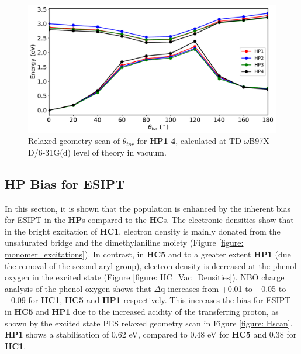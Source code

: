 \begin{figure}[t]
\centering
  \includegraphics[width=0.9\linewidth]{5ConnectingCrystalStructure/2HP_scan_vac.pdf}
  \caption[Relaxed geometry scan of $\theta_{tor}$ for \textbf{HP} derivatives]{Relaxed geometry scan of $\theta_{tor}$ for \textbf{HP1}-\textbf{4}, calculated at TD-$\omega$B97X-D/6-31G(d) level of theory in vacuum.}
  \label{figure: HP_scan_vac}
\end{figure}
\subsection{\textbf{HP} Bias for ESIPT}\label{section: Connecting_Bias}
In this section, it is shown that the \Kstar{} population is enhanced by the inherent bias for ESIPT in the \textbf{HP}s compared to the \textbf{HC}s. The electronic densities show that in the bright excitation of \textbf{HC1}, electron density is mainly donated from the unsaturated bridge and the dimethylaniline moiety (Figure \ref{figure: monomer_excitations}). In contrast, in \textbf{HC5} and to a greater extent \textbf{HP1} (due the removal of the second aryl group), electron density is decreased at the phenol oxygen in the excited state (Figure \ref{figure: HC_Vac_Densities}). NBO charge analysis of the phenol oxygen shows that $\Delta$q increases from +0.01 to +0.05 to +0.09 for \textbf{HC1}, \textbf{HC5} and \textbf{HP1} respectively. This increases the bias for ESIPT in \textbf{HC5} and \textbf{HP1} due to the increased acidity of the transferring proton, as shown by the excited state PES relaxed geometry scan in Figure \ref{figure: Hscan}. \textbf{HP1} shows a stabilisation of 0.62 eV, compared to 0.48 eV for \textbf{HC5} and 0.38 for \textbf{HC1}. 

